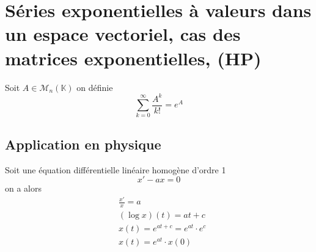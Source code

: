 \documentclass[11pt,colorlinks]{book}
\theoremstyle{mytheoremstyle}
\theoremstyle{mytheoremstyle}
\theoremstyle{mytheoremstyle}
\theoremstyle{mytheoremstyle}
\theoremstyle{mytheoremstyle}
\theoremstyle{mytheoremstyle}
\theoremstyle{mytheoremstyle}
\theoremstyle{mytheoremstyle}
\theoremstyle{myproblemstyle}
\def\mbb#1{\mathbb{#1}}
\def\mfc#1{\mathcal{#1}}
\def\bK{\mbb{K}}
\begin{document}
\section{Séries exponentielles à valeurs dans un espace vectoriel, cas des matrices exponentielles, (HP)}
\begin{definition}
  Soit $A \in \mfc{M}_n(\bK)$ on définie
  \begin{equation*}
    \sum_{k=0}^{\infty} \frac{A^k}{k!} = e^A
  \end{equation*}
\end{definition}
\subsection{Application en physique}
\begin{definition}
  Soit une équation différentielle linéaire homogène d'ordre 1 
  \begin{equation*}
    x' - ax = 0
  \end{equation*}
  on a alors 
  \begin{align*}
    &\frac{x'}{x} = a \\ 
    &(\log x)(t) = at + c \\ 
    &x(t) = e^{at+c} = e^{at} \cdot e^c \\ 
    &x(t) = e^{at} \cdot x(0)
  \end{align*}
\end{definition}
\end{document}
